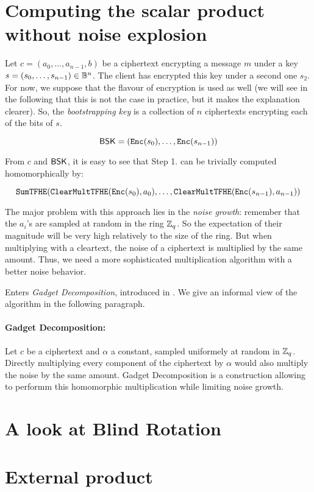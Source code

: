 \section{Computing the scalar product without noise explosion}

Let $c = (a_0, \dots, a_{n-1}, b)$ be a \LWE ciphertext encrypting a message $m$ under a key $s = (s_0, \dots, s_{n-1}) \in \mathbb{B}^n$. The client has encrypted this key under a second one $s_2$. For now, we suppose that the \LWE flavour of encryption is used as well (we will see in the following that this is not the case in practice, but it makes the explanation clearer). So, the \textit{bootstrapping key} is a collection of $n$ ciphertexts encrypting each of the bits of $s$.

\begin{equation}
	\textsf{BSK} = \left ( \texttt{Enc}(s_0), \dots, \texttt{Enc}(s_{n-1}) \right )
\end{equation}



From $c$ and $\textsf{BSK}$, it is easy to see that Step 1. can be trivially computed homomorphically by:

\begin{equation*}
	\texttt{SumTFHE}(\texttt{ClearMultTFHE}(\texttt{Enc}(s_0), a_0), \dots, \texttt{ClearMultTFHE}(\texttt{Enc}(s_{n-1}), a_{n-1}))
\end{equation*}


The major problem with this approach lies in the \textit{noise growth}: remember that the $a_i$'s are sampled at random in the ring $\mathbb{Z}_q$. So the expectation of their magnitude will be very high relatively to the size of the ring. But when multiplying with a cleartext, the noise of a ciphertext is multiplied by the same amount. Thus, we need a more sophisticated multiplication algorithm with a better noise behavior.

Enters \textit{Gadget Decomposition}, introduced in \cite{GSW13}. We give an informal view of the algorithm in the following paragraph.


\paragraph{Gadget Decomposition: }


Let $c$ be a \LWE ciphertext and $\alpha$ a constant, sampled uniformely at random in $\mathbb{Z}_q$. Directly multiplying every component of the ciphertext by $\alpha$ would also multiply the noise by the same amount. Gadget Decomposition is a construction allowing to performm this homomorphic multiplication while limiting noise growth.





\section{A look at Blind Rotation}




\section{External product}


